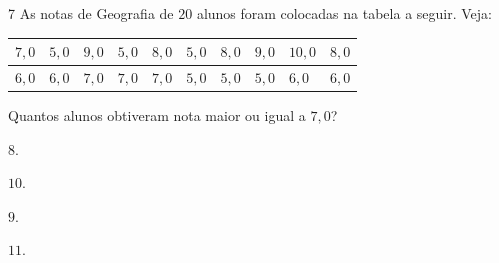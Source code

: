


\num{7}  As notas de Geografia de $20$ alunos foram colocadas na tabela a seguir. Veja:

\begin{longtable}[]{@{}llllllllll@{}}
\toprule
$7,0$ & $5,0$ & $9,0$ & $5,0$ & $8,0$ & $5,0$ & $8,0$ & $9,0$ & $10,0$ &
$8,0$\tabularnewline
\midrule
\endhead
$6,0$ & $6,0$ & $7,0$ & $7,0$ & $7,0$ & $5,0$ & $5,0$ & $5,0$ & $6,0$ & $6,0$\tabularnewline
\bottomrule
\end{longtable}

Quantos alunos obtiveram nota maior ou igual a $7,0$?

\begin{escolha}
\item $8$.
\item $10$.
\item $9$.
\item $11$.
\end{escolha}


